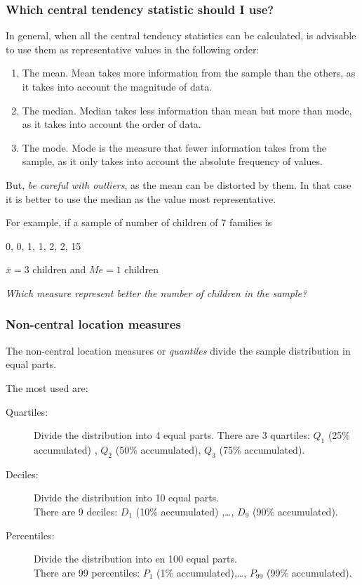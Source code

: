 \begin{frame}
\frametitle{Which central tendency statistic should I use?}
In general, when all the central tendency statistics can be calculated, is advisable to use them as representative
values in the following order:
\begin{enumerate}
\item The mean. Mean takes more information from the sample than the others, as it takes into account the magnitude
of data.
\item The median. Median takes less information than mean but more than mode, as it takes into account the order
of data.
\item The mode. Mode is the measure that fewer information takes from the sample, as it only takes into account the
absolute frequency of values.
\end{enumerate}

But, \emph{be careful with outliers}, as the mean can be distorted by them.
In that case it is better to use the median as the value most representative.

For example, if a sample of number of children of 7 families is
\begin{center}
0, 0, 1, 1, 2, 2, 15

$\bar{x}=3$ children \quad and \quad $Me=1$ children

\emph{Which measure represent better the number of children in the sample?}
\end{center}
\end{frame}


\begin{frame}
\frametitle{Non-central location measures}
The non-central location measures or \emph{quantiles} divide the sample distribution in equal parts.

The most used are:
\begin{description}
\item[Quartiles:] Divide the distribution into 4 equal parts. 
There are 3 quartiles: $Q_1$ (25\% accumulated) , $Q_2$ (50\% accumulated), $Q_3$ (75\% accumulated).
\item[Deciles:] Divide the distribution into 10 equal parts.\\
There are 9 deciles: $D_1$ (10\% accumulated) ,\ldots, $D_9$ (90\% accumulated).
\item[Percentiles:] Divide the distribution into en 100 equal parts.\\
There are 99 percentiles: $P_1$ (1\% accumulated),\ldots, $P_{99}$ (99\% accumulated).
\end{description}
\end{frame}


